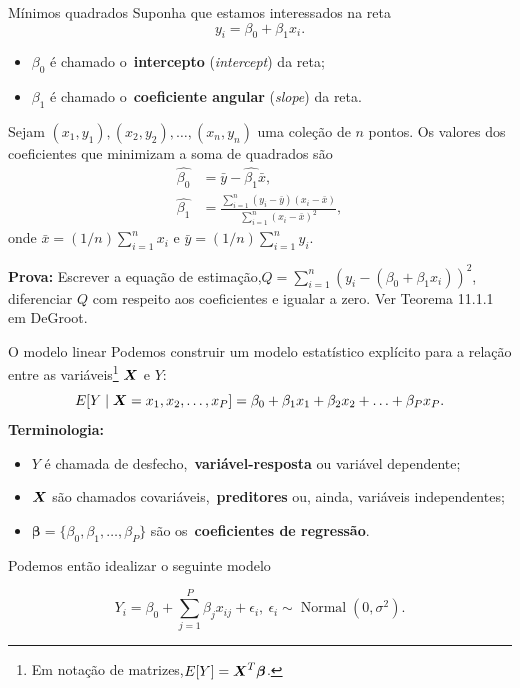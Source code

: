 \begin{frame}{Mínimos quadrados}
Suponha que estamos interessados na reta 
\begin{equation}
 \label{eq:line}
 y_i = \beta_0  + \beta_1x_i.
\end{equation}
\begin{itemize}
 \item $\beta_0$ é chamado o~\textbf{intercepto} (\textit{intercept}) da reta;
 \item $\beta_1$ é chamado o~\textbf{coeficiente angular} (\textit{slope}) da reta.
\end{itemize}

\begin{theo}
 Sejam $(x_1, y_1), (x_2, y_2), \ldots, (x_n, y_n)$ uma coleção de $n$ pontos.
 Os valores dos coeficientes que minimizam a soma de quadrados são
 \begin{align*}
  \hat{\beta_0} &= \bar{y} - \hat{\beta_1}\bar{x},\\
  \hat{\beta_1} &= \frac{\sum_{i=1}^n (y_i-\bar{y})(x_i-\bar{x})}{\sum_{i=1}^n \left(x_i - \bar{x}\right)^2},
 \end{align*}
 onde $\bar{x} = (1/n)\sum_{i=1}^n x_i$ e $\bar{y} = (1/n)\sum_{i=1}^n y_i$.
\end{theo}
\textbf{Prova:} Escrever a equação de estimação,$Q = \sum_{i=1}^n \left(y_i - (\beta_0 + \beta_1x_i) \right)^2$, diferenciar $Q$ com respeito aos coeficientes e igualar a zero. 
Ver Teorema 11.1.1 em DeGroot.
\end{frame}

\begin{frame}{O modelo linear}
 Podemos construir um modelo estatístico explícito para a relação entre as variáveis\footnote{Em notação de matrizes,$E[Y] = \boldsymbol{X}^T\boldsymbol{\beta}$.} $\boldsymbol{X}$ e $Y$:
 \begin{equation}
  \label{eq:lin_mod}
  E[Y \mid \boldsymbol{X} = x_1, x_2, \ldots, x_P] = \beta_0 + \beta_1x_1 + \beta_2x_2 + \ldots + \beta_Px_P.  
 \end{equation}
\textbf{Terminologia:}
\begin{itemize}
\item $Y$ é chamada de desfecho,~\textbf{variável-resposta} ou variável dependente;
\item $\boldsymbol{X}$ são chamados covariáveis,~\textbf{preditores} ou, ainda, variáveis independentes;
\item $\boldsymbol{\beta} = \{\beta_0, \beta_1, \ldots, \beta_P\}$ são os~\textbf{coeficientes de regressão}.
\end{itemize}

Podemos então idealizar o seguinte modelo
\begin{ideia}
 \[ Y_i = \beta_0 + \sum_{j=1}^P \beta_jx_{ij} + \epsilon_i,\: \epsilon_i \sim\operatorname{Normal}(0, \sigma^2).\]
\end{ideia}
\end{frame}

